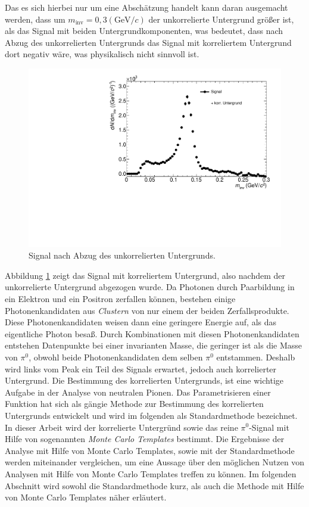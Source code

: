 Das es sich hierbei nur um eine Absch{\"a}tzung handelt kann daran ausgemacht werden, dass um $m_{\text{inv}} = 0,3 (\text{GeV/}c)$ der unkorrelierte Untergrund gr{\"o}{\ss}er ist, als das Signal mit beiden Untergrundkomponenten, was bedeutet, dass nach Abzug des unkorrelierten Untergrunds das Signal mit korreliertem Untergrund dort negativ w{\"a}re, was physikalisch nicht sinnvoll ist.
\begin{figure}[tbp]
\centering
\includegraphics[width=.75\linewidth]{hInvMass_Data.pdf}
\caption{Signal nach Abzug des unkorrelierten Untergrunds.}
\label{figInvMass_Data}
\end{figure}
\newline
Abbildung \ref{figInvMass_Data} zeigt das Signal mit korreliertem Untergrund, also nachdem der unkorrelierte Untergrund abgezogen wurde.
Da Photonen durch Paarbildung in ein Elektron und ein Positron zerfallen k\"onnen, bestehen einige Photonenkandidaten aus \textit{Clustern} von nur einem der beiden Zerfallsprodukte.
Diese Photonenkandidaten weisen dann eine geringere Energie auf, als das eigentliche Photon besa{\ss}.
Durch Kombinationen mit diesen Photonenkandidaten entstehen Datenpunkte bei einer invarianten Masse, die geringer ist als die Masse von $\pi^{0}$, obwohl beide Photonenkandidaten dem selben $\pi^{0}$ entstammen.
Deshalb wird links vom Peak ein Teil des Signals erwartet, jedoch auch korrelierter Untergrund.
\newline
Die Bestimmung des korrelierten Untergrunds, ist eine wichtige Aufgabe in der Analyse von neutralen Pionen.
Das Parametrisieren einer Funktion hat sich als g\"angie Methode zur Bestimmung des korrelierten Untergrunds entwickelt und wird im folgenden als Standardmethode bezeichnet.
In dieser Arbeit wird der korrelierte Untergr\"und sowie das reine $\pi^{0}$-Signal mit Hilfe von sogenannten \textit{Monte Carlo Templates} bestimmt.
Die Ergebnisse der Analyse mit Hilfe von Monte Carlo Templates, sowie mit der Standardmethode werden miteinander vergleichen, um eine Aussage \"uber den m\"oglichen Nutzen von Analysen mit Hilfe von Monte Carlo Templates treffen zu k\"onnen.
Im folgenden Abschnitt wird sowohl die Standardmethode kurz, als auch die Methode mit Hilfe von Monte Carlo Templates n\"aher erl\"autert.